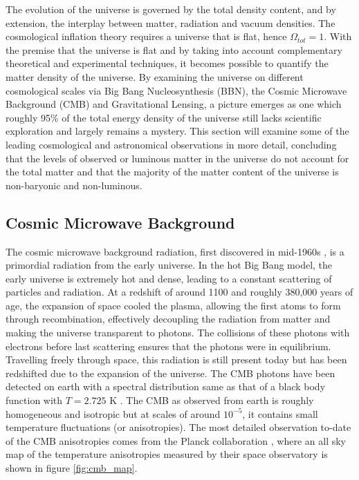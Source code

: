 The evolution of the universe is governed by the total density content, and by extension, the interplay between matter, radiation and vacuum densities. The cosmological inflation theory requires a universe that is flat, hence $\Omega_{tot} = 1$. With the premise that the universe is flat and by taking into account complementary theoretical and experimental techniques, it becomes possible to quantify the matter density of the universe. By examining the universe on  different cosmological scales via Big Bang Nucleosynthesis (BBN), the Cosmic Microwave Background (CMB) and Gravitational Lensing, a picture emerges as one which roughly 95\% of the total energy density of the universe still lacks scientific exploration and largely remains a mystery. This section will examine some of the leading cosmological and astronomical observations in more detail, concluding that the levels of observed or luminous matter in the universe do not account for the total matter and that the majority of the matter content of the universe is non-baryonic and non-luminous. 

\subsection{Cosmic Microwave Background}
\label{subsec:CMB}

The cosmic microwave background radiation, first discovered in mid-1960s \cite{CMB_disc}, is a primordial radiation from the early universe. In the hot Big Bang model, the early universe is extremely hot and dense, leading to a constant scattering of particles and radiation. At a redshift of around 1100 and roughly 380,000 years of age, the expansion of space cooled the plasma, allowing the first atoms to form through recombination, effectively decoupling the radiation from matter and making the universe transparent to photons. The collisions of these photons with electrons before last scattering ensures that the photons were in equilibrium. Travelling freely through space, this radiation is still present today but has been redshifted due to the expansion of the universe. The CMB photons have been detected on earth with a spectral distribution same as that of a black body function with $T = 2.725$ K \cite{cmb_temp}. The CMB as observed from earth is roughly homogeneous and isotropic but at scales of around $10^{-5}$, it contains small temperature fluctuations (or anisotropies). The most detailed observation to-date of the CMB anisotropies comes from the Planck collaboration \cite{plank_cmb_map}, where an all sky map of the temperature anisotropies measured by their space observatory is shown in figure \ref{fig:cmb_map}.

